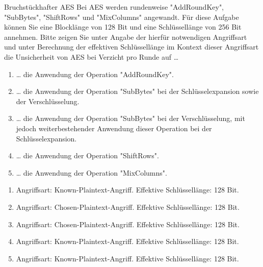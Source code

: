\documentclass{article}
\begin{document}
\begin{exercise}{Bruchstückhafter AES}
  Bei AES werden rundenweise "AddRoundKey", "SubBytes", "ShiftRows" und "MixColumns" angewandt. Für diese Aufgabe können Sie eine Blocklänge von 128 Bit und eine Schlüssellänge von 256 Bit annehmen. Bitte zeigen Sie unter Angabe der hierfür notwendigen Angriffsart und unter Berechnung der effektiven Schlüssellänge im Kontext dieser Angriffsart die Unsicherheit von AES bei Verzicht pro Runde auf …
  \begin{enumerate}
    \item … die Anwendung der Operation "AddRoundKey".
    \item … die Anwendung der Operation "SubBytes" bei der Schlüsselexpansion sowie der Verschlüsselung.
    \item … die Anwendung der Operation "SubBytes" bei der Verschlüsselung, mit jedoch weiterbestehender Anwendung dieser Operation bei der Schlüsselexpansion.
    \item … die Anwendung der Operation "ShiftRows".
    \item … die Anwendung der Operation "MixColumns".
  \end{enumerate}

  \begin{solution}
    \begin{enumerate}
      \item Angriffsart: Known-Plaintext-Angriff. Effektive Schlüssellänge: 128 Bit.
      \item Angriffsart: Chosen-Plaintext-Angriff. Effektive Schlüssellänge: 128 Bit.
      \item Angriffsart: Chosen-Plaintext-Angriff. Effektive Schlüssellänge: 128 Bit.
      \item Angriffsart: Known-Plaintext-Angriff. Effektive Schlüssellänge: 128 Bit.
      \item Angriffsart: Known-Plaintext-Angriff. Effektive Schlüssellänge: 128 Bit.
    \end{enumerate}
  \end{solution}
\end{exercise}
\end{document}
